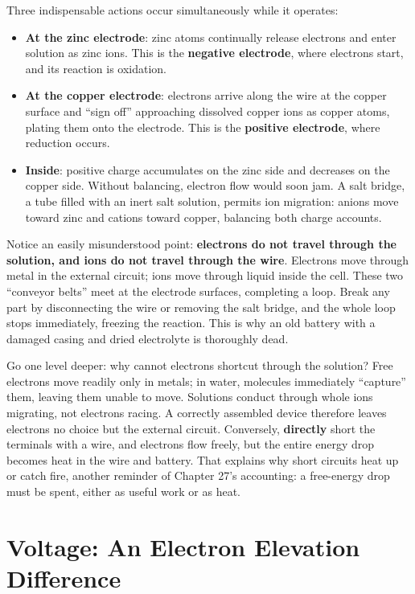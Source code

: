 Three indispensable actions occur simultaneously while it operates:

\begin{itemize}[itemsep=2pt]
\item \textbf{At the zinc electrode}: zinc atoms continually release electrons and enter solution as zinc ions. This is the \textbf{negative electrode}, where electrons start, and its reaction is oxidation.
\item \textbf{At the copper electrode}: electrons arrive along the wire at the copper surface and ``sign off'' approaching dissolved copper ions as copper atoms, plating them onto the electrode. This is the \textbf{positive electrode}, where reduction occurs.
\item \textbf{Inside}: positive charge accumulates on the zinc side and decreases on the copper side. Without balancing, electron flow would soon jam. A salt bridge, a tube filled with an inert salt solution, permits ion migration: anions move toward zinc and cations toward copper, balancing both charge accounts.
\end{itemize}

Notice an easily misunderstood point: \textbf{electrons do not travel through the solution, and ions do not travel through the wire}. Electrons move through metal in the external circuit; ions move through liquid inside the cell. These two ``conveyor belts'' meet at the electrode surfaces, completing a loop. Break any part by disconnecting the wire or removing the salt bridge, and the whole loop stops immediately, freezing the reaction. This is why an old battery with a damaged casing and dried electrolyte is thoroughly dead.

Go one level deeper: why cannot electrons shortcut through the solution? Free electrons move readily only in metals; in water, molecules immediately ``capture'' them, leaving them unable to move. Solutions conduct through whole ions migrating, not electrons racing. A correctly assembled device therefore leaves electrons no choice but the external circuit. Conversely, \textbf{directly} short the terminals with a wire, and electrons flow freely, but the entire energy drop becomes heat in the wire and battery. That explains why short circuits heat up or catch fire, another reminder of Chapter 27's accounting: a free-energy drop must be spent, either as useful work or as heat.

\section{Voltage: An Electron Elevation Difference}


